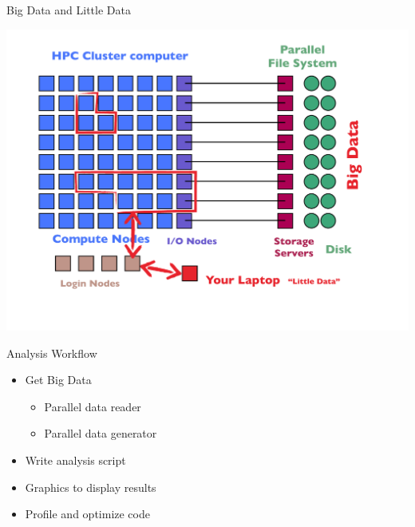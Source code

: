 \begin{frame}{Big Data and Little Data}
\begin{minipage}{10cm}
  \includegraphics[height=0.9\textheight]
  {../common/pics/hardware/ParallelHardware22.pdf}\hfill
\end{minipage}
\begin{minipage}{5cm}\small
  \begin{block}{Analysis Workflow}\pause
    \begin{itemize}[<+-|alert@+>]
    \item Get Big Data
      \begin{itemize}
      \item Parallel data reader
      \item Parallel data generator
      \end{itemize}
    \item Write analysis script
    \item Graphics to display results
    \item Profile and optimize code
    \end{itemize}
  \end{block}
\end{minipage}
\end{frame}


